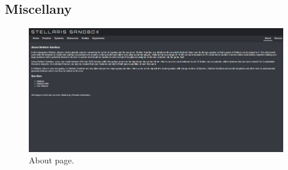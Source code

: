 \documentclass[12pt]{article}
\let\Oldsubsection\subsection
\renewcommand{\subsection}{\FloatBarrier\Oldsubsection}
\begin{document}
\newpage
\subsection{Miscellany}

\begin{figure}[!ht]
  \caption{About page.}
  \includegraphics[width=\textwidth]{screenshots/misc/about.png}
\end{figure}
\end{document}
